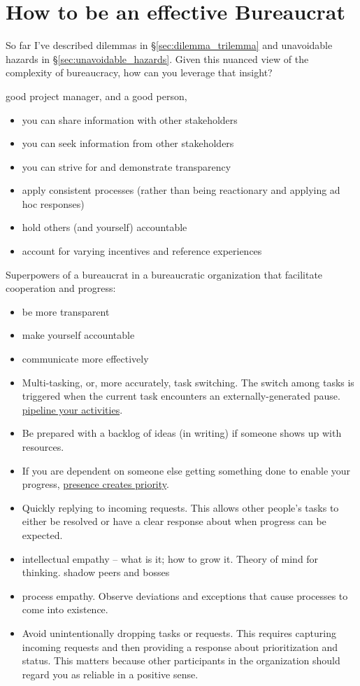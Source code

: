 \section{How to be an effective Bureaucrat\label{sec:effective_bureaucrat}}

So far I've described dilemmas in \S\ref{sec:dilemma_trilemma} and unavoidable hazards in \S\ref{sec:unavoidable_hazards}. Given this nuanced view of the complexity of bureaucracy, how can you leverage that insight?

good project manager, and a good person,

\begin{itemize}
\item you can share information with other stakeholders
\item you can seek information from other stakeholders
\item you can strive for and demonstrate transparency
\item apply consistent processes (rather than being reactionary and applying ad hoc responses)
\item hold others (and yourself) accountable 
\item account for varying incentives and reference experiences
\end{itemize}


Superpowers of a bureaucrat in a bureaucratic organization that facilitate cooperation and progress:
\begin{itemize}
    \item be more transparent
    \item make yourself accountable
    \item communicate more effectively
    \item Multi-tasking, or, more accurately, task switching. The switch among tasks is triggered when the current task encounters an externally-generated pause. \href{https://en.wikipedia.org/wiki/Pipeline_(computing)#Concept_and_motivation}{pipeline your activities}.
    \item Be prepared with a backlog of ideas (in writing) if someone shows up with resources.
    \item If you are dependent on someone else getting something done to enable your progress, \underline{presence creates priority}.
    \item Quickly replying to incoming requests. This allows other people's tasks to either be resolved or have a clear response about when progress can be expected. 
    \item intellectual empathy -- what is it; how to grow it. Theory of mind for thinking. shadow peers and bosses
    \item process empathy. Observe deviations and exceptions that cause processes to come into existence. 
    \item Avoid unintentionally dropping tasks or requests. This requires capturing incoming requests and then providing a response about prioritization and status. This matters because other participants in the organization should regard you as reliable in a positive sense. 
\end{itemize}

